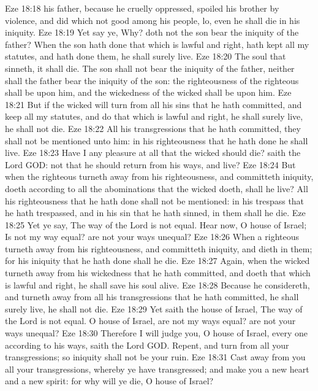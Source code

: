 \vs Eze 18:18  his father, because he cruelly oppressed, spoiled his brother by violence, and did  which  not good among his people, lo, even he shall die in his iniquity.
\vs Eze 18:19 Yet say ye, Why? doth not the son bear the iniquity of the father? When the son hath done that which is lawful and right,  hath kept all my statutes, and hath done them, he shall surely live.
\vs Eze 18:20 The soul that sinneth, it shall die. The son shall not bear the iniquity of the father, neither shall the father bear the iniquity of the son: the righteousness of the righteous shall be upon him, and the wickedness of the wicked shall be upon him.
\vs Eze 18:21 But if the wicked will turn from all his sins that he hath committed, and keep all my statutes, and do that which is lawful and right, he shall surely live, he shall not die.
\vs Eze 18:22 All his transgressions that he hath committed, they shall not be mentioned unto him: in his righteousness that he hath done he shall live.
\vs Eze 18:23 Have I any pleasure at all that the wicked should die? saith the Lord GOD:  not that he should return from his ways, and live?
\vs Eze 18:24 But when the righteous turneth away from his righteousness, and committeth iniquity,  doeth according to all the abominations that the wicked  doeth, shall he live? All his righteousness that he hath done shall not be mentioned: in his trespass that he hath trespassed, and in his sin that he hath sinned, in them shall he die.
\vs Eze 18:25 Yet ye say, The way of the Lord is not equal. Hear now, O house of Israel; Is not my way equal? are not your ways unequal?
\vs Eze 18:26 When a righteous  turneth away from his righteousness, and committeth iniquity, and dieth in them; for his iniquity that he hath done shall he die.
\vs Eze 18:27 Again, when the wicked  turneth away from his wickedness that he hath committed, and doeth that which is lawful and right, he shall save his soul alive.
\vs Eze 18:28 Because he considereth, and turneth away from all his transgressions that he hath committed, he shall surely live, he shall not die.
\vs Eze 18:29 Yet saith the house of Israel, The way of the Lord is not equal. O house of Israel, are not my ways equal? are not your ways unequal?
\vs Eze 18:30 Therefore I will judge you, O house of Israel, every one according to his ways, saith the Lord GOD. Repent, and turn  from all your transgressions; so iniquity shall not be your ruin.
\vs Eze 18:31 Cast away from you all your transgressions, whereby ye have transgressed; and make you a new heart and a new spirit: for why will ye die, O house of Israel?
